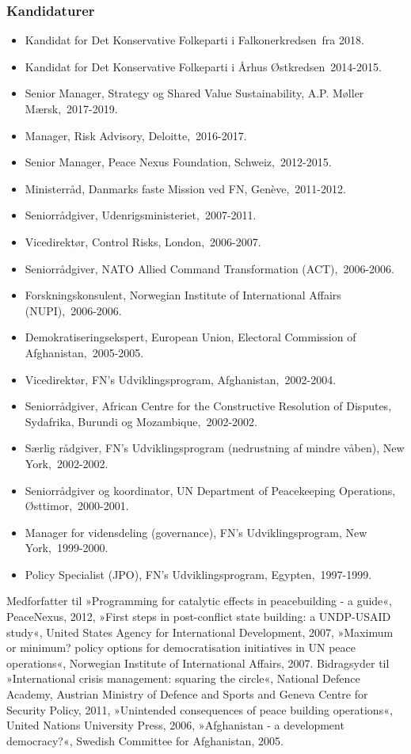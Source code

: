 \documentclass[11pt, a4paper]{awesome-cv}
\begin{document}
\begin{cvletter}
\subsubsection*{Kandidaturer}
\begin{itemize}
\item Kandidat for Det Konservative Folkeparti i Falkonerkredsen fra 2018.
\item Kandidat for Det Konservative Folkeparti i Århus Østkredsen 2014-2015.
\end{itemize}
\begin{itemize}
\item Senior Manager, Strategy og Shared Value Sustainability, A.P. Møller Mærsk, 2017-2019.
\item Manager, Risk Advisory, Deloitte, 2016-2017.
\item Senior Manager, Peace Nexus Foundation, Schweiz, 2012-2015.
\item Ministerråd, Danmarks faste Mission ved FN, Genève, 2011-2012.
\item Seniorrådgiver, Udenrigsministeriet, 2007-2011.
\item Vicedirektør, Control Risks, London, 2006-2007.
\item Seniorrådgiver, NATO Allied Command Transformation (ACT), 2006-2006.
\item Forskningskonsulent, Norwegian Institute of International Affairs (NUPI), 2006-2006.
\item Demokratiseringsekspert, European Union, Electoral Commission of Afghanistan, 2005-2005.
\item Vicedirektør, FN's Udviklingsprogram, Afghanistan, 2002-2004.
\item Seniorrådgiver, African Centre for the Constructive Resolution of Disputes, Sydafrika, Burundi og Mozambique, 2002-2002.
\item Særlig rådgiver, FN's Udviklingsprogram (nedrustning af mindre våben), New York, 2002-2002.
\item Seniorrådgiver og koordinator, UN Department of Peacekeeping Operations, Østtimor, 2000-2001.
\item Manager for vidensdeling (governance), FN's Udviklingsprogram, New York, 1999-2000.
\item Policy Specialist (JPO), FN's Udviklingsprogram, Egypten, 1997-1999.
\end{itemize}
Medforfatter til »Programming for catalytic effects in peacebuilding - a guide«, PeaceNexus, 2012,  »First steps in post-conflict state building: a UNDP-USAID study«, United States Agency for International Development, 2007, »Maximum or minimum? policy options for democratisation initiatives in UN peace operations«, Norwegian Institute of International Affairs, 2007. Bidragsyder til »International crisis management: squaring the circle«, National Defence Academy, Austrian Ministry of Defence and Sports and Geneva Centre for Security Policy, 2011, »Unintended consequences of peace building operations«, United Nations University Press, 2006, »Afghanistan - a development democracy?«, Swedish Committee for Afghanistan, 2005.

\end{cvletter}
\end{document}
